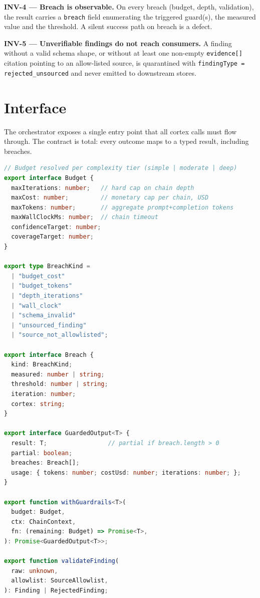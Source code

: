 \begin{invariant}
\textbf{INV-4 --- Breach is observable.} On every breach (budget, depth, validation), the result carries a \texttt{breach} field enumerating the triggered guard(s), the measured value and the threshold. A silent success path on breach is a defect.
\end{invariant}

\begin{invariant}
\textbf{INV-5 --- Unverifiable findings do not reach consumers.} A finding without a valid schema shape, or without at least one non-empty \texttt{evidence[]} citation pointing to an allow-listed source, is quarantined with \texttt{findingType = rejected\_unsourced} and never emitted to downstream stores.
\end{invariant}

\section{Interface}

The orchestrator exposes a single entry point that all cortex calls must flow through. The contract is total: every outcome maps to a typed result, including breaches.

\begin{lstlisting}[language=TypeScript]
// Budget resolved per complexity tier (simple | moderate | deep)
export interface Budget {
  maxIterations: number;   // hard cap on chain depth
  maxCost: number;         // monetary cap per chain, USD
  maxTokens: number;       // aggregate prompt+completion tokens
  maxWallClockMs: number;  // chain timeout
  confidenceTarget: number;
  coverageTarget: number;
}

export type BreachKind =
  | "budget_cost"
  | "budget_tokens"
  | "depth_iterations"
  | "wall_clock"
  | "schema_invalid"
  | "unsourced_finding"
  | "source_not_allowlisted";

export interface Breach {
  kind: BreachKind;
  measured: number | string;
  threshold: number | string;
  iteration: number;
  cortex: string;
}

export interface GuardedOutput<T> {
  result: T;                 // partial if breach.length > 0
  partial: boolean;
  breaches: Breach[];
  usage: { tokens: number; costUsd: number; iterations: number; };
}

export function withGuardrails<T>(
  budget: Budget,
  ctx: ChainContext,
  fn: (remaining: Budget) => Promise<T>,
): Promise<GuardedOutput<T>>;

export function validateFinding(
  raw: unknown,
  allowlist: SourceAllowlist,
): Finding | RejectedFinding;
\end{lstlisting}

